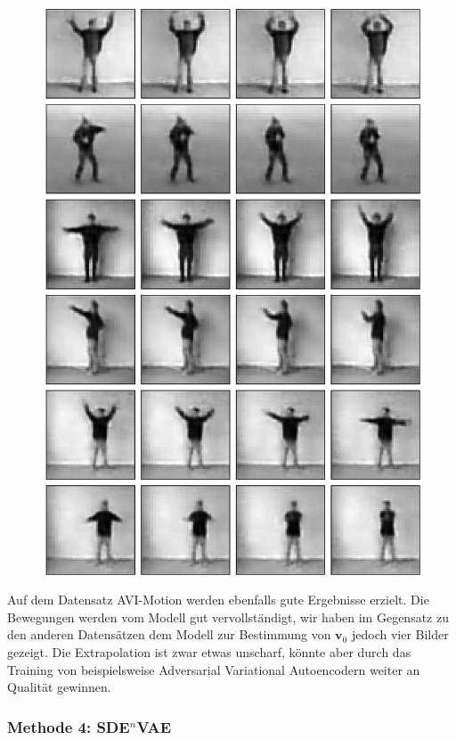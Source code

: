 \documentclass[12pt]{article}
\begin{document}
\begin{figure}[h!]
\begin{minipage}[position=r]{0.5\textwidth}
\begin{mdframed}[style=inner]
				\includegraphics[scale=0.47]{movies_extrapolation}
			\end{mdframed}
		\end{minipage}
	\end{figure}
	Auf dem Datensatz AVI-Motion werden ebenfalls gute Ergebnisse erzielt. Die Bewegungen werden vom Modell gut vervollständigt, wir haben im Gegensatz zu den anderen Datensätzen dem Modell zur Bestimmung von $\mathbf{v}_0$ jedoch vier Bilder gezeigt. Die Extrapolation ist zwar etwas unscharf, könnte aber durch das Training von beispielsweise Adversarial Variational Autoencodern weiter an Qualität gewinnen. 
	\newpage
	\subsubsection{Methode 4: SDE$^n$VAE}
\end{document}
